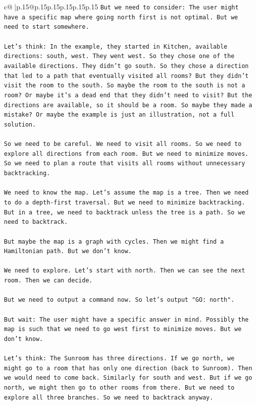 \documentclass{article}
\begin{document}
{\begin{supertabular}{c@{$\;$}|p{.15\linewidth}@{}p{.15\linewidth}p{.15\linewidth}p{.15\linewidth}p{.15\linewidth}p{.15\linewidth}}
{{{\texttt{But we need to consider: The user might have a specific map where going north first is not optimal. But we need to start somewhere.} \\
\\ 
\texttt{Let's think: In the example, they started in Kitchen, available directions: south, west. They went west. So they chose one of the available directions. They didn't go south. So they chose a direction that led to a path that eventually visited all rooms? But they didn't visit the room to the south. So maybe the room to the south is not a room? Or maybe it's a dead end that they didn't need to visit? But the directions are available, so it should be a room. So maybe they made a mistake? Or maybe the example is just an illustration, not a full solution.} \\
\\ 
\texttt{So we need to be careful. We need to visit all rooms. So we need to explore all directions from each room. But we need to minimize moves. So we need to plan a route that visits all rooms without unnecessary backtracking.} \\
\\ 
\texttt{We need to know the map. Let's assume the map is a tree. Then we need to do a depth{-}first traversal. But we need to minimize backtracking. But in a tree, we need to backtrack unless the tree is a path. So we need to backtrack.} \\
\\ 
\texttt{But maybe the map is a graph with cycles. Then we might find a Hamiltonian path. But we don't know.} \\
\\ 
\texttt{We need to explore. Let's start with north. Then we can see the next room. Then we can decide.} \\
\\ 
\texttt{But we need to output a command now. So let's output "GO: north".} \\
\\ 
\texttt{But wait: The user might have a specific answer in mind. Possibly the map is such that we need to go west first to minimize moves. But we don't know.} \\
\\ 
\texttt{Let's think: The Sunroom has three directions. If we go north, we might go to a room that has only one direction (back to Sunroom). Then we would need to come back. Similarly for south and west. But if we go north, we might then go to other rooms from there. But we need to explore all three branches. So we need to backtrack anyway.} \\
}}}
\end{supertabular}}
\end{document}
